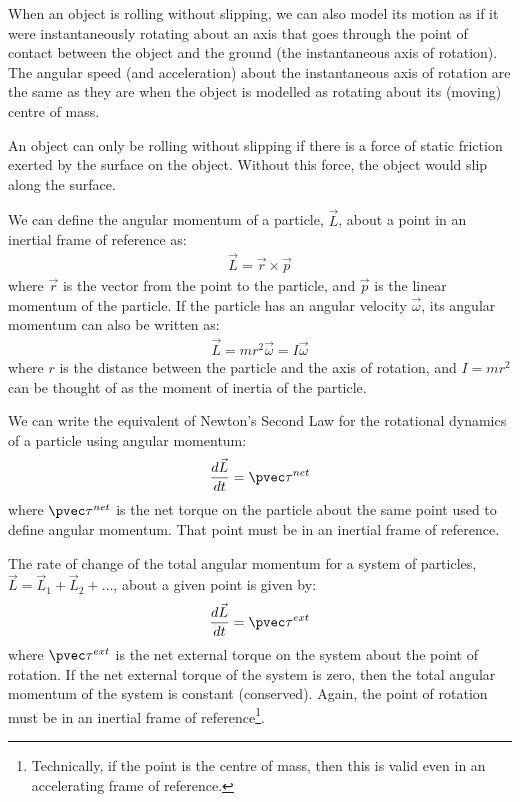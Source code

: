 \begin{chapterSummary}
When an object is rolling without slipping, we can also model its motion as if it were instantaneously rotating about an axis that goes through the point of contact between the object and the ground (the instantaneous axis of rotation). The angular speed (and acceleration) about the instantaneous axis of rotation are the same as they are when the object is modelled as rotating about its (moving) centre of mass. 

An object can only be rolling without slipping if there is a force of static friction exerted by the surface on the object. Without this force, the object would slip along the surface.

We can define the angular momentum of a particle, $\vec L$, about a point in an inertial frame of reference as:
\begin{align*}
\vec L = \vec r \times \vec p
\end{align*}
where $\vec r$ is the vector from the point to the particle, and $\vec p$ is the linear momentum of the particle. If the particle has an angular velocity $\vec\omega$, its angular momentum can also be written as:
\begin{align*}
\vec L = mr^2\vec\omega = I\vec\omega
\end{align*}
where $r$ is the distance between the particle and the axis of rotation, and $I=mr^2$ can be thought of as the moment of inertia of the particle.

We can write the equivalent of Newton's Second Law for the rotational dynamics of a particle using angular momentum:
\begin{align*}
\frac{d\vec L}{dt}=\pvec\tau^{net}
\end{align*}
where $\pvec \tau^{net}$ is the net torque on the particle about the same point used to define angular momentum. That point must be in an inertial frame of reference.

The rate of change of the total angular momentum for a system of particles, $\vec L=\vec L_1 + \vec L_2 +\dots$, about a given point is given by:
\begin{align*}
\frac{d\vec L}{dt}=\pvec\tau^{ext}
\end{align*}
where $\pvec\tau^{ext}$ is the net external torque on the system about the point of rotation. If the net external torque of the system is zero, then the total angular momentum of the system is constant (conserved). Again, the point of rotation must be in an inertial frame of reference\footnote{Technically, if the point is the centre of mass, then this is valid even in an accelerating frame of reference.}.


\end{chapterSummary}
